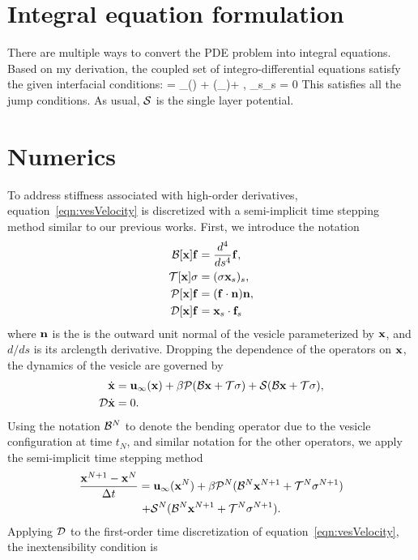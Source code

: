 \documentclass[aps,prl,twocolumn,showpacs]{revtex4}
\begin{document}
\section{Integral equation formulation}
There are multiple ways to convert the PDE problem into integral
equations. Based on my derivation, the coupled set of
integro-differential equations satisfy the given interfacial conditions:
\beq 
  \dot{\mbx} = \mbu_\infty(\mbx) + \beta (\mbf_\cdot\mbn)\mbn + , 
  \label{eqn:vesVelocity}
\eeq
\beq 
  \mbx_s\cdot\dot{\mbx}_s = 0 
\eeq
This satisfies all the jump conditions. As usual, $\mathcal{S}$ is the single layer potential. 

\section{Numerics}
To address stiffness associated with high-order derivatives,
equation~\eqref{eqn:vesVelocity} is discretized with a semi-implicit
time stepping method similar to our previous works.  First, we introduce
the notation
\begin{align}
  \mathcal{B}[\mathbf{x}]\mathbf{f} &= \frac{d^4}{ds^4} \mathbf{f}, \\
  \mathcal{T}[\mathbf{x}]\sigma &= (\sigma \mathbf{x}_s)_s, \\
  \mathcal{P}[\mathbf{x}]\mathbf{f} &= (\mathbf{f} \cdot \mathbf{n}) \mathbf{n}, \\
  \mathcal{D}[\mathbf{x}]\mathbf{f} &= \mathbf{x}_s \cdot \mathbf{f}_s
\end{align}
where $\mathbf{n}$ is the is the outward unit normal of the vesicle
parameterized by $\mathbf{x}$, and $d/ds$ is its arclength derivative.
Dropping the dependence of the operators on $\mathbf{x}$, the dynamics of the
vesicle are governed by
\begin{align}
  \dot{\mathbf{x}} &= \mathbf{u}_{\infty}(\mathbf{x}) + 
  \beta \mathcal{P}(\mathcal{B}\mathbf{x} + \mathcal{T}\sigma) + \mathcal{S}(\mathcal{B}\mathbf{x} + \mathcal{T}\sigma), \\
  \mathcal{D} \dot{\mathbf{x}} &= 0.
\end{align}
Using the notation $\mathcal{B}^N$ to denote the bending operator due to the
vesicle configuration at time $t_N$, and similar notation for the other
operators, we apply the semi-implicit time stepping method
\begin{multline}  
  \frac{\mathbf{x}^{N+1} - \mathbf{x}^N}{\Delta t} = \mathbf{u}_\infty(\mathbf{x}^N) 
  + \beta \mathcal{P}^N(\mathcal{B}^N\mathbf{x}^{N+1} + \mathcal{T}^N\sigma^{N+1})  \\
  + \mathcal{S}^N(\mathcal{B}^N\mathbf{x}^{N+1} + \mathcal{T}^N\sigma^{N+1}).
\end{multline}
Applying $\mathcal{D}$ to the first-order time discretization of
equation~\eqref{eqn:vesVelocity}, the inextensibility condition is
\end{document}
